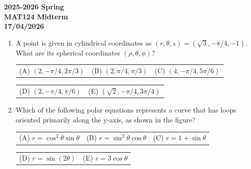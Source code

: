 \documentclass[a4paper, 12pt]{article}
\begin{document}
\pagestyle{empty}

\begin{center}
\textbf{2025-2026 Spring \\MAT124 Midterm\\17/04/2026}
\end{center}

\begin{enumerate}[leftmargin=*,label=\textbf{\arabic*.}]

\item A point is given in cylindrical coordinates as $(r,\theta,z)=\left(\sqrt{3},-\pi/4,-1\right)$. What are its spherical coordinates $(\rho, \theta, \phi)$?

\begin{center}
\begin{tabular}{lll}
(A) $(2, -\pi/4, 2\pi/3)$ &
(B) $(2, \pi/4, \pi/3)$ &
(C) $(4, -\pi/4, 5\pi/6)$
\end{tabular}

\begin{tabular}{ll}
(D) $(2, -\pi/4, \pi/6)$ &
(E) $(\sqrt2, -\pi/4, 3\pi/4)$
\end{tabular}
\end{center}

\item \leavevmode
\vspace{-1.2em}

\begin{minipage}[b]{0.66\textwidth}
Which of the following polar equations represents a curve that has loops oriented primarily along the y-axis, as shown in the figure?

\begin{center}
\begin{tabular}{lll}
(A) $r = \cos^2\theta \sin\theta$ &
(B) $r = \sin^2\theta \cos\theta$ &
(C) $r = 1 + \sin\theta$
\end{tabular}

\begin{tabular}{ll}
(D) $r = \sin(2\theta)$ &
(E) $r = 3\cos\theta$
\end{tabular}
\end{center}
\end{minipage}
\hfill
\begin{minipage}[t]{0.25\textwidth}
\centering
{}
\end{minipage}


\end{enumerate}
\end{document}
